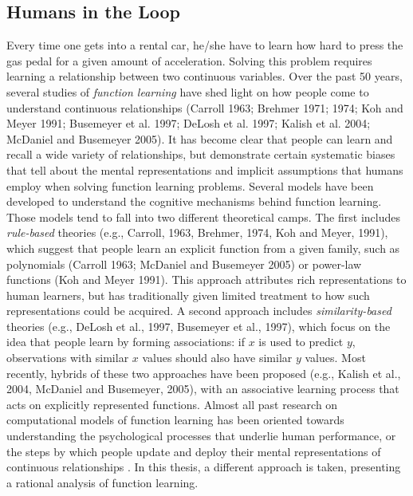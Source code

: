 \subsection{Humans in the Loop} Every time one gets into a rental car, he/she have to learn how hard to press the gas pedal for a given amount of acceleration. Solving this problem requires learning a relationship between two continuous variables. Over the past 50 years, several studies of \textit{function learning} have shed light on how people come to understand continuous relationships (Carroll 1963; Brehmer 1971; 1974; Koh and Meyer 1991; Busemeyer et al. 1997; DeLosh et al. 1997; Kalish et al. 2004; McDaniel and Busemeyer 2005). It has become clear that people can learn and recall a wide variety of relationships, but demonstrate certain systematic biases that tell about the mental representations and implicit assumptions that humans employ when solving function learning problems. Several models have been developed to understand the cognitive mechanisms behind function learning. Those models tend to fall into two different theoretical camps. The first includes \textit{rule-based} theories (e.g., Carroll, 1963, Brehmer, 1974, Koh and Meyer, 1991), which suggest that people learn an explicit function from a given family, such as polynomials (Carroll 1963; McDaniel and Busemeyer 2005) or power-law functions (Koh and Meyer 1991). This approach attributes rich representations to human learners, but has traditionally given limited treatment to how such representations could be acquired. A second approach includes \textit{similarity-based} theories (e.g., DeLosh et al., 1997, Busemeyer et al., 1997), which focus on the idea that people learn by forming associations: if $x$ is used to predict $y$, observations with similar $x$ values should also have similar $y$ values. Most recently, hybrids of these two approaches have been proposed (e.g., Kalish et al., 2004, McDaniel and Busemeyer, 2005), with an associative learning process that acts on explicitly represented functions. Almost all past research on computational models of function learning has been oriented towards understanding the psychological processes that underlie human performance, or the steps by which people update and deploy their mental representations of continuous relationships \cite{Lucas2015}. In this thesis, a different approach is taken, presenting a rational analysis of function learning. \\

